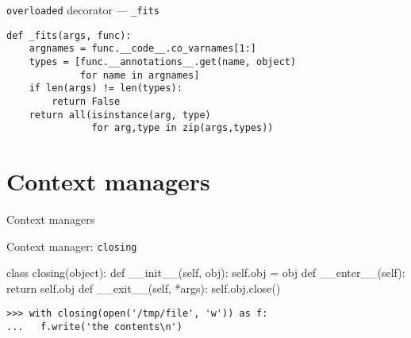 \documentclass{beamer}
\begin{document}
\begin{frame}[fragile]{\texttt{overloaded} decorator --- \texttt{\_fits}}
  \begin{verbatim}
def _fits(args, func):
    argnames = func.__code__.co_varnames[1:]
    types = [func.__annotations__.get(name, object)
             for name in argnames]
    if len(args) != len(types):
        return False
    return all(isinstance(arg, type)
               for arg,type in zip(args,types))
  \end{verbatim}
\end{frame}


\section{Context managers}

\begin{frame}{}
  \center\Huge Context managers
\end{frame}


\begin{frame}[fragile]{Context manager: \texttt{closing}}
  \begin{pycode}
     class closing(object):
         def __init__(self, obj):
             self.obj = obj
         def __enter__(self):
             return self.obj
         def __exit__(self, *args):
             self.obj.close()
  \end{pycode}
  \pause
  \begin{verbatim}
>>> with closing(open('/tmp/file', 'w')) as f:
...   f.write('the contents\n')
  \end{verbatim}
\end{frame}
\end{document}
